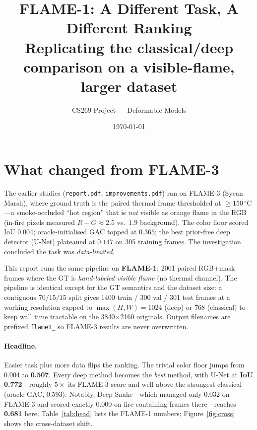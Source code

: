 \documentclass[10pt]{article}
\title{\vspace{-2.5em}FLAME-1: A Different Task, A Different Ranking\\
\large Replicating the classical/deep comparison on a visible-flame, larger dataset}
\author{CS269 Project --- Deformable Models}
\date{\today}
\begin{document}
\maketitle
\vspace{-1.5em}

\section{What changed from FLAME-3}

The earlier studies (\texttt{report.pdf}, \texttt{improvements.pdf}) ran on
FLAME-3 (Sycan Marsh), where ground truth is the paired thermal frame
thresholded at $\ge150\,^\circ$C---a smoke-occluded ``hot region'' that is
\emph{not} visible as orange flame in the RGB (in-fire pixels measured $R{-}G
\approx 2.5$ vs.\ $1.9$ background). The color floor scored IoU $0.004$;
oracle-initialised GAC topped at $0.365$; the best prior-free deep detector
(U-Net) plateaued at $0.147$ on 305 training frames. The investigation concluded
the task was \emph{data-limited}.

This report runs the same pipeline on \textbf{FLAME-1}: 2001 paired RGB+mask
frames where the GT is \emph{hand-labeled visible flame} (no thermal channel).
The pipeline is identical except for the GT semantics and the dataset size: a
contiguous $70/15/15$ split gives 1400 train / 300 val / 301 test frames at a
working resolution capped to $\max(H,W){=}1024$ (deep) or $768$ (classical) to
keep wall time tractable on the 3840$\times$2160 originals. Output filenames
are prefixed \texttt{flame1\_} so FLAME-3 results are never overwritten.

\paragraph{Headline.} Easier task plus more data flips the ranking. The trivial
color floor jumps from 0.004 to \textbf{0.507}. Every deep method becomes the
\emph{best} method, with U-Net at \textbf{IoU 0.772}---roughly $5\times$ its
FLAME-3 score and well above the strongest classical (oracle-GAC, 0.593).
Notably, Deep Snake---which managed only 0.032 on FLAME-3 and scored exactly
0.000 on fire-containing frames there---reaches \textbf{0.681} here.
Table~\ref{tab:head} lists the FLAME-1 numbers; Figure~\ref{fig:cross} shows
the cross-dataset shift.
\end{document}
